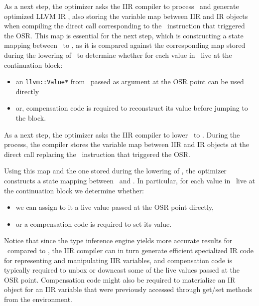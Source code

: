 \begin{enumerate}[noitemsep]
\begin{enumerate}
\ifdefined \fullver
As a next step, the optimizer asks the IIR compiler to process \fOptIIR\ and generate optimized LLVM IR \fOptIR, also storing the variable map between IIR and IR objects when compiling the direct call corresponding to the \feval\ instruction that triggered the OSR.
This map is essential for the next step, which is constructing a state mapping between \fIR\ to \fOptIR, as it is compared against the corresponding map stored during the lowering of \fIIR\ to determine whether for each value in \fOptIR\ live at the continuation block:
\begin{itemize}[noitemsep, partopsep=0.5ex, topsep=0.5ex]
\item an {\tt llvm::Value*} from \fIR\ passed as argument at the OSR point can be used directly
\item or, compensation code is required to reconstruct its value before jumping to the block.
\end{itemize}
\else
As a next step, the optimizer asks the IIR compiler to lower \fOptIIR\ to \fOptIR. During the process, the compiler stores the variable map between IIR and IR objects at the direct call replacing the \feval\ instruction that triggered the OSR.

Using this map and the one stored during the lowering of \fIIR, the optimizer constructs a state mapping between \fIR\ and \fOptIR. In particular, for each value in \fOptIR\ live at the continuation block we determine whether:
\begin{itemize}[noitemsep, partopsep=0.5ex, topsep=0.5ex]
\item we can assign to it a live value passed at the OSR point directly,
\item or a compensation code is required to set its value.
\end{itemize}
\fi

\noindent Notice that since the type inference engine yields more accurate results for \fOptIIR\ compared to \fIIR, the IIR compiler can in turn generate efficient specialized IR code for representing and manipulating IIR variables, and compensation code is typically required to unbox or downcast some of the live values passed at the OSR point.
\ifdefined \fullver
Compensation code might also be required to materialize an IR object for an IIR variable that were previously accessed through get/set methods from the environment. %
\fi


\end{enumerate}
\end{enumerate}
